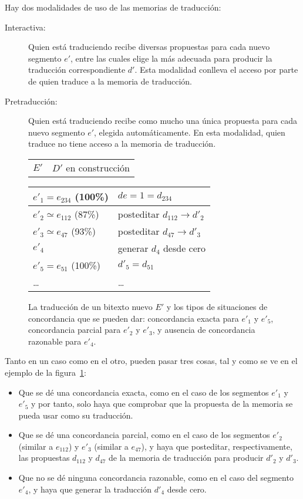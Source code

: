 Hay dos modalidades de uso de las memorias de traducción: \begin{description} \item[Interactiva:] Quien está traduciendo recibe diversas propuestas para cada nuevo segmento $e'$, entre las cuales elige la más adecuada para producir la traducción correspondiente $d'$. Esta modalidad conlleva el acceso por parte de quien traduce a la memoria de traducción. \item[Pretraducción:] Quien está traduciendo recibe como mucho una única propuesta para cada nuevo segmento $e'$, elegida automáticamente. En esta modalidad, quien traduce no tiene acceso a la memoria de traducción. \end{description} \begin{figure} \begin{center} \begin{tabular}{p{3cm}p{4cm}} $E'$ &$D'$ en construcción \end{tabular} \begin{tabular}{|p{3cm}|p{4cm}|} \hline

$e'_1=e_{234}$ (100\%)& $de=1=d_{234}$ \\\hline $e'_2\simeq e_{112}$ (87\%) &posteditar $d_{112} \to d'_2$ \\\hline $e'_3\simeq e_{47}$ (93\%) &posteditar $d_{47} \to d'_3$ \\\hline $e'_4$ &generar $d_4$ desde cero \\\hline $e'_5=e_{51}$ (100\%) &$d'_5=d_{51}$ \\\hline \ldots &\ldots \\\hline \end{tabular} \end{center} \caption{La traducción de un bitexto nuevo $E'$ y los tipos de situaciones de concordancia que se pueden dar: concordancia exacta para $e'_1$ y $e'_5$, concordancia parcial para $e'_2$ y $e'_3$, y ausencia de concordancia razonable para $e'_4$.} \label{fg:pretrad} \end{figure} Tanto en un caso como en el otro, pueden pasar tres cosas, tal y como se ve en el ejemplo de la figura~\ref{fg:pretrad}: \begin{itemize} \item Que se dé una concordancia exacta, como en el caso de los segmentos $e'_1$ y $e'_5$ y por tanto, solo haya que comprobar que la propuesta de la memoria se pueda usar como su traducción. \item Que se dé una concordancia parcial, como en el caso de los segmentos $e'_2$ (similar a $e_{112}$) y $e'_3$ (similar a $e_{47}$), y haya que posteditar, respectivamente, las propuestas $d_{112}$ y $d_{47}$ de la memoria de traducción para producir $d'_2$ y $d'_3$. \item Que no se dé ninguna concordancia razonable, como en el caso del segmento $e'_4$, y haya que generar la traducción $d'_4$ desde cero. \end{itemize} 

